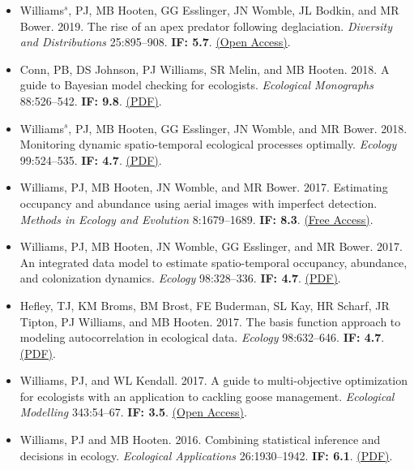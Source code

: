 \begin{itemize}
\item Williams$^s$, PJ, MB Hooten, GG Esslinger, JN Womble, JL Bodkin, and MR Bower. 2019. The rise of an apex predator following deglaciation. \emph{Diversity and Distributions} 25:895--908. \textbf{IF: 5.7}. \href{https://onlinelibrary.wiley.com/doi/10.1111/ddi.12908}{(Open Access)}.
\item Conn, PB, DS Johnson, PJ Williams, SR Melin, and MB Hooten. 2018. A guide to Bayesian model checking for ecologists. \emph{Ecological Monographs} 88:526--542. \textbf{IF: 9.8}. \href{http://www.perrywilliams.us/wp-content/uploads/2023/05/conn2018guide.pdf}{(PDF)}.
\item Williams$^s$, PJ, MB Hooten, GG Esslinger, JN Womble, and MR Bower. 2018. Monitoring dynamic spatio-temporal ecological processes optimally. \emph{Ecology} 99:524--535. \textbf{IF: 4.7}. \href{http://www.perrywilliams.us/wp-content/uploads/2023/05/williams2018monitoring.pdf}{(PDF)}.
\item Williams, PJ, MB Hooten, JN Womble, and MR Bower. 2017. Estimating occupancy and abundance using aerial images with imperfect detection. \emph{Methods in Ecology and Evolution} 8:1679--1689. \textbf{IF: 8.3}. \href{https://besjournals.onlinelibrary.wiley.com/doi/10.1111/2041-210X.12815}{(Free Access)}.
\item Williams, PJ, MB Hooten, JN Womble, GG Esslinger, and MR Bower. 2017. An integrated data model to estimate spatio-temporal occupancy, abundance, and colonization dynamics. \emph{Ecology} 98:328--336. \textbf{IF: 4.7}. \href{http://www.perrywilliams.us/wp-content/uploads/2023/05/williams2017integrated.pdf}{(PDF)}.
\item Hefley, TJ, KM Broms, BM Brost, FE Buderman, SL Kay, HR Scharf, JR Tipton, PJ Williams, and MB Hooten. 2017. The basis function approach to modeling autocorrelation in ecological data. \emph{Ecology} 98:632--646. \textbf{IF: 4.7}. \href{http://www.perrywilliams.us/wp-content/uploads/2023/05/hefley2017basis.pdf}{(PDF)}.
\item Williams, PJ, and WL Kendall. 2017. A guide to multi-objective optimization for ecologists with an application to cackling goose management. \emph{Ecological Modelling} 343:54--67. \textbf{IF: 3.5}. \href{https://www.sciencedirect.com/science/article/pii/S0304380016305610?via%3Dihub}{(Open Access)}.
\item Williams, PJ and MB Hooten. 2016. Combining statistical inference and decisions in ecology. \emph{Ecological Applications} 26:1930--1942. \textbf{IF: 6.1}. \href{http://www.perrywilliams.us/wp-content/uploads/2023/05/williams2016combining.pdf}{(PDF)}.

\end{itemize}
